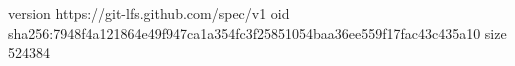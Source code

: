 version https://git-lfs.github.com/spec/v1
oid sha256:7948f4a121864e49f947ca1a354fc3f25851054baa36ee559f17fac43c435a10
size 524384

